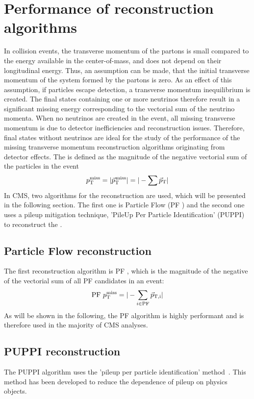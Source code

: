 \section{Performance of \ptmiss reconstruction algorithms}
\noindent\justify
In collision events, the transverse momentum of the partons is small compared to the energy available in the center-of-mass, and does not depend on their longitudinal energy. 
Thus, an assumption can be made, that the initial transverse momentum of the system formed by the partons is zero. 
As an effect of this assumption, if particles escape detection, a transverse momentum inequilibrium is created. 
The final states containing one or more neutrinos therefore result in a significant missing energy corresponding to the vectorial sum of the neutrino momenta. 
When no neutrinos are created in the event, all missing transverse momentum is due to detector inefficiencies and reconstruction issues. 
Therefore, final states without neutrinos are ideal for the study of the performance of the missing transverse momentum reconstruction algorithms originating from detector effects.
The \ptmiss is defined as the magnitude of the negative vectorial sum of the particles in the event
\begin{equation}
p_{\mathrm{T}}^\text{miss} = |{\vec p}_{\mathrm{T}}^{\kern1pt\text{miss}}|=|- \sum \vec{p}_{\mathrm{T}}|
\end{equation}                                                                      
In CMS, two algorithms for the \ptmiss reconstruction are used, which will be presented in the following section. 
The first one is Particle Flow \ptmiss (PF \ptmiss) and the second one uses a pileup mitigation technique, 'PileUp Per Particle Identification' (PUPPI) to reconstruct the \ptmiss. 
\subsection*{Particle Flow \ptmiss reconstruction}
\noindent
\justify
The first reconstruction algorithm is PF \ptmiss, which is the magnitude of the negative of the vectorial sum of all PF candidates in an event:
\begin{equation}
\mathrm{PF}\,\, p_{\mathrm{T}}^\text{miss} =|- \sum_{i\in \mathrm{PF}} \vec{p}_{\mathrm{T, i}}|
\label{eq:MET}
\end{equation}                                                                      
As will be shown in the following, the PF \ptmiss algorithm is highly performant and is therefore used in the majority of CMS analyses.
\subsection*{PUPPI \ptmiss reconstruction}
\noindent
\justify
The PUPPI \ptmiss algorithm uses the 'pileup per particle identification' method~\cite{Bertolini:2014bba}. This method has been developed to reduce the dependence of pileup on physics objects. 
